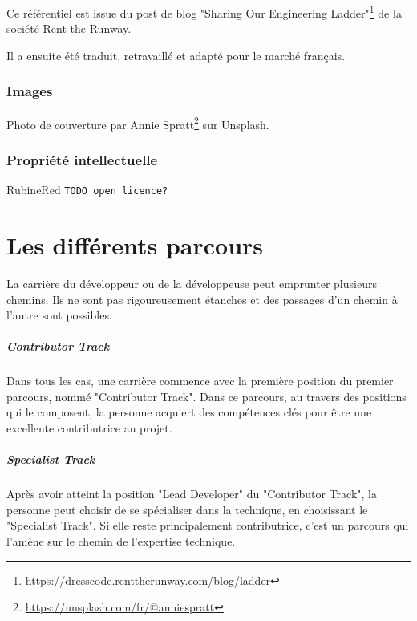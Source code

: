 \documentclass[a4paper, french, openany, 12pt]{book}
\newcommand{\fullwidthimage}[1]{
  \begin{center}
    \makebox[\textwidth]{\texttt{[image: \#1]}}
  \end{center}
}
\newcommand{\todo}[1]{
  \begin{color}{RubineRed}
    \texttt{TODO {#1}}
  \end{color}
}
\begin{document}
Ce référentiel est issue du post de blog 
"Sharing Our Engineering Ladder"\footnote{\url{https://dresscode.renttherunway.com/blog/ladder}}
de la société Rent the Runway.

Il a ensuite été traduit, retravaillé et adapté pour le marché français.

\section*{Images}

Photo de couverture par Annie Spratt\footnote{\url{https://unsplash.com/fr/@anniespratt}} sur Unsplash.

\section*{Propriété intellectuelle}

\todo{open licence?}

\mainmatter

\part{Les différents parcours}

\fullwidthimage{images/tracks.png}

La carrière du développeur ou de la développeuse peut emprunter plusieurs chemins.
Ils ne sont pas rigoureusement étanches et des passages d'un chemin à l'autre sont possibles.

\subsubsection*{Contributor Track}

Dans tous les cas, une carrière commence avec la première position du premier parcours, nommé "Contributor Track".
Dans ce parcours, au travers des positions qui le composent, la personne acquiert des compétences clés pour être une
excellente contributrice au projet.

\subsubsection*{Specialist Track}

Après avoir atteint la position "Lead Developer" du "Contributor Track", la personne peut choisir de se spécialiser dans
la technique, en choisissant le "Specialist Track".
Si elle reste principalement contributrice, c'est un parcours qui l'amène sur le chemin de l'expertise technique.
\end{document}
